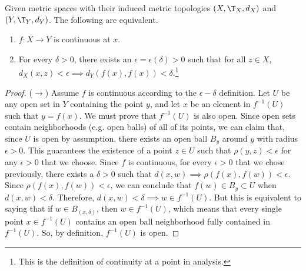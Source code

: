   \begin{theorem}[Analytic Continuity = Topological Continuity] 
    Given metric spaces with their induced metric topologies $(X, \T_X, d_X)$ and $(Y, \T_Y, d_Y)$. The following are equivalent. 
    \begin{enumerate}
      \item $f: X \rightarrow Y$ is continuous at $x$. 
      \item For every $\delta > 0$, there exists an $\epsilon = \epsilon(\delta) > 0$ such that for all $z \in X$, $d_X (x, z) < \epsilon \implies d_Y (f(x), f(x)) < \delta$.\footnote{This is the definition of continuity at a point in analysis.} 
    \end{enumerate}
  \end{theorem}
  \begin{proof}
    ($\rightarrow$) Assume $f$ is continuous according to the $\epsilon - \delta$ definition. Let $U$ be any open set in $Y$ containing the point $y$, and let $x$ be an element in $f^{-1}(U)$ such that $y = f(x)$. We must prove that $f^{-1}(U)$ is also open. Since open sets contain neighborhoods (e.g. open balls) of all of its points, we can claim that, since $U$ is open by assumption, there exists an open ball $B_y$ around $y$ with radius $\epsilon > 0$. This guarantees the existence of a point $z \in U$ such that $\rho(y, z) < \epsilon$ for any $\epsilon > 0$ that we choose. Since $f$ is continuous, for every $\epsilon >0$ that we chose previously, there exists a $\delta >0$ such that $d(x, w) \implies \rho(f(x), f(w)) < \epsilon$. Since $\rho(f(x), f(w)) < \epsilon$, we can conclude that $f(w) \in B_y \subset U$ when $d(x, w) < \delta$. Therefore, $d(x, w) < \delta \implies w \in f^{-1}(U)$. But this is equivalent to saying that if $w \in B_(x, \delta)$, then $w \in f^{-1}(U)$, which means that every single point $x \in f^{-1}(U)$ contains an open ball neighborhood fully contained in $f^{-1}(U)$. So, by definition, $f^{-1}(U)$ is open. 



\end{proof}
